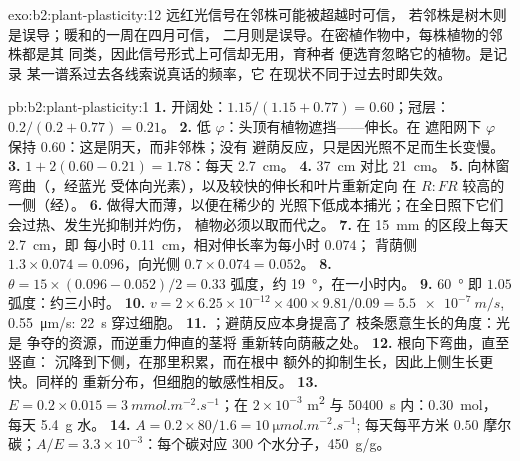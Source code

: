 \begin{solution}{exo:b2:plant-plasticity:12}
远红光信号在邻株可能被超越时可信，
若邻株是树木则是误导；暖和的一周在四月可信，
二月则是误导。在密植作物中，每株植物的邻株都是其
同类，因此信号形式上可信却无用，育种者
便选育忽略它的植物。是记录
某一谱系过去各线索说真话的频率，它
在现状不同于过去时即失效。
\end{solution}

\begin{solution}{pb:b2:plant-plasticity:1}
\textbf{1.} 开阔处：$1.15/(1.15 + 0.77) = 0.60$；冠层：$0.2/(0.2 +
0.77) = 0.21$。
\textbf{2.} 低 $\varphi$：头顶有植物遮挡——伸长。在
遮阳网下 $\varphi$ 保持 $0.60$：这是阴天，而非邻株；没有
避荫反应，只是因光照不足而生长变慢。
\textbf{3.} $1 + 2(0.60 - 0.21) = 1.78$：每天 \qty{2.7}{cm}。
\textbf{4.} \qty{37}{cm} 对比 \qty{21}{cm}。
\textbf{5.} 向林窗弯曲（，经蓝光
受体向光素），以及较快的伸长和叶片重新定向
在 $R{:}FR$ 较高的一侧（经）。
\textbf{6.} 做得大而薄，以便在稀少的
光照下低成本捕光；在全日照下它们会过热、发生光抑制并灼伤，
植物必须以取而代之。
\textbf{7.} 在 \qty{15}{mm} 的区段上每天 \qty{2.7}{cm}，即
每小时 \qty{0.11}{cm}，相对伸长率为每小时 $0.074$；
背荫侧 $1.3\times 0.074 = 0.096$，向光侧 $0.7\times 0.074 =
0.052$。
\textbf{8.} $\theta = 15\times(0.096 - 0.052)/2 = 0.33$ 弧度，约
\qty{19}{\degree}，在一小时内。
\textbf{9.} \qty{60}{\degree} 即 $1.05$ 弧度：约三小时。
\textbf{10.} $v = 2\times 6.25\times 10^{-12}\times 400\times
9.81/0.09 = \qty{5.5e-7}{m/s}$, \qty{0.55}{\micro m/s}: \qty{22}{s}
穿过细胞。
\textbf{11.} ；避荫反应本身提高了
枝条愿意生长的角度：光是
争夺的资源，而逆重力伸直的茎将
重新转向荫蔽之处。
\textbf{12.} 根向下弯曲，直至竖直：
沉降到下侧，在那里积累，而在根中
额外的抑制生长，因此上侧生长更快。同样的
重新分布，但细胞的敏感性相反。
\textbf{13.} $E = 0.2\times 0.015 = \qty{3}{mmol.m^{-2}.s^{-1}}$；在
$2\times 10^{-3}$ \unit{m^2} 与 \qty{50400}{s} 内：\qty{0.30}{mol}，
每天 \qty{5.4}{g} 水。
\textbf{14.} $A = 0.2\times 80/1.6 = \qty{10}{\micro mol.m^{-2}.s^{-1}}$;
每天每平方米 $0.50$ 摩尔碳；$A/E = 3.3\times
10^{-3}$：每个碳对应 300 个水分子，\qty{450}{g/g}。

\end{solution}
